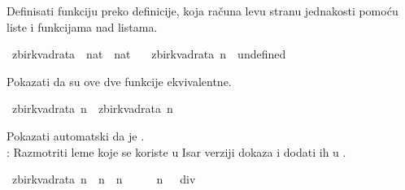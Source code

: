 \begin{isabellebody}
\begin{exercise}[subtitle=Sumiranje nizova preko listi.]
\begin{isamarkuptext}%
Definisati funkciju  preko definicije,
      koja računa levu stranu jednakosti pomoću liste i funkcijama nad listama.%
\end{isamarkuptext}\isamarkuptrue%
\isamarkupfalse%
\ zbir{\isacharunderscore}{\kern0pt}kvadrata{\isacharprime}{\kern0pt}\ {\isacharcolon}{\kern0pt}{\isacharcolon}{\kern0pt}\ {\isachardoublequoteopen}nat\ {\isasymRightarrow}\ nat{\isachardoublequoteclose}\ \isanewline
\ \ {\isachardoublequoteopen}zbir{\isacharunderscore}{\kern0pt}kvadrata{\isacharprime}{\kern0pt}\ n\ {\isacharequal}{\kern0pt}\ undefined{\isachardoublequoteclose}%
\begin{isamarkuptext}%
Pokazati da su ove dve funkcije ekvivalentne.%
\end{isamarkuptext}\isamarkuptrue%
\isamarkupfalse%
\ {\isachardoublequoteopen}zbir{\isacharunderscore}{\kern0pt}kvadrata\ n\ {\isacharequal}{\kern0pt}\ zbir{\isacharunderscore}{\kern0pt}kvadrata{\isacharprime}{\kern0pt}\ n{\isachardoublequoteclose}\isanewline
\ \ %
\isadelimproof
%
\endisadelimproof
%
\isatagproof
%
\endisatagproof
{\isafoldproof}%
%
\isadelimproof
%
\endisadelimproof
%
\begin{isamarkuptext}%
Pokazati automatski da je .\\
      : Razmotriti leme koje se koriste u Isar verziji dokaza i dodati ih u .%
\end{isamarkuptext}\isamarkuptrue%
\isamarkupfalse%
\ {\isachardoublequoteopen}zbir{\isacharunderscore}{\kern0pt}kvadrata\ n\ {\isacharequal}{\kern0pt}\ n\ {\isacharasterisk}{\kern0pt}\ {\isacharparenleft}{\kern0pt}n\ {\isacharplus}{\kern0pt}\ {}{\isacharparenright}{\kern0pt}\ {\isacharasterisk}{\kern0pt}\ {\isacharparenleft}{\kern0pt}{}\ {\isacharasterisk}{\kern0pt}\ n\ {\isacharplus}{\kern0pt}\ {}{\isacharparenright}{\kern0pt}\ div\ {}{\isachardoublequoteclose}\isanewline

\end{exercise}
\end{isabellebody}
